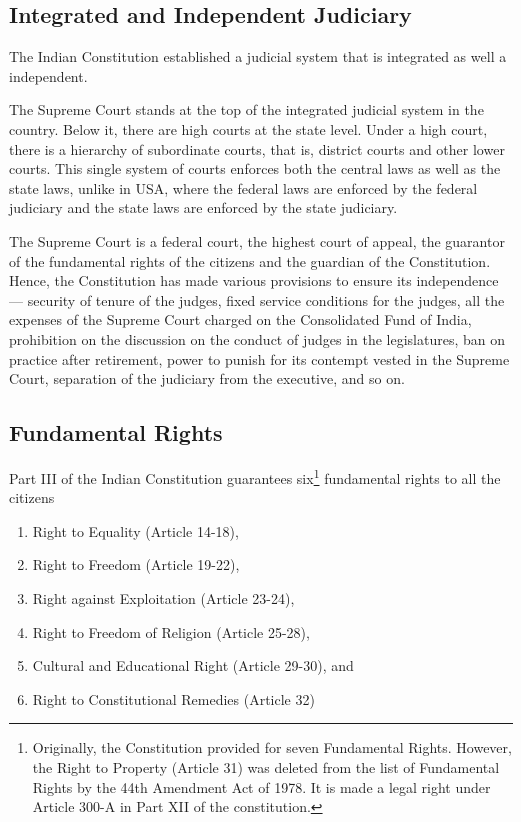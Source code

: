 \subsection{Integrated and Independent Judiciary}

The Indian Constitution established a judicial system that is integrated as well a independent.

The Supreme Court stands at the top of the integrated judicial system in the country. Below it, there are high courts at the state level. Under a high court, there is a hierarchy of subordinate courts, that is, district courts and other lower courts. This single system of courts enforces both the central laws as well as the state laws, unlike in USA, where the federal laws are enforced by the federal judiciary and the state laws are enforced by the state judiciary.

The Supreme Court is a federal court, the highest court of appeal, the guarantor of the fundamental rights of the citizens and the guardian of the Constitution. Hence, the Constitution has made various provisions to ensure its independence — security of tenure of the judges, fixed service conditions for the judges, all the expenses of the Supreme Court charged on the Consolidated Fund of India, prohibition on the discussion on the conduct of judges in the legislatures, ban on practice after retirement, power to punish for its contempt vested in the Supreme Court, separation of the judiciary from the executive, and so on.

\subsection{Fundamental Rights}

Part III of the Indian Constitution guarantees six\footnote{Originally, the Constitution provided for seven Fundamental Rights. However, the Right to Property (Article 31) was deleted from the list of Fundamental Rights by the 44th Amendment Act of 1978. It is made a legal right under Article 300-A in Part XII of the constitution.} fundamental rights to all the citizens

\renewcommand{\labelenumi}{\textbf{(\alph{enumi})}}
\begin{enumerate}
  \item Right to Equality (Article 14-18),
  \item Right to Freedom (Article 19-22),
  \item Right against Exploitation (Article 23-24),
  \item Right to Freedom of Religion (Article 25-28),
  \item Cultural and Educational Right (Article 29-30), and
  \item Right to Constitutional Remedies (Article 32)
\end{enumerate}

